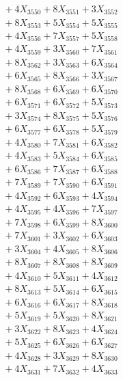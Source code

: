 \documentclass[a4paper,10pt]{article}
\begin{document}
{\begin{align}
&\;  + 4 X_{3550} + 8 X_{3551} + 3 X_{3552} \\[0.3ex]
&\;  + 8 X_{3553} + 5 X_{3554} + 5 X_{3555} \\[0.3ex]
&\;  + 4 X_{3556} + 7 X_{3557} + 5 X_{3558} \\[0.3ex]
&\;  + 4 X_{3559} + 3 X_{3560} + 7 X_{3561} \\[0.3ex]
&\;  + 8 X_{3562} + 3 X_{3563} + 6 X_{3564} \\[0.3ex]
&\;  + 6 X_{3565} + 8 X_{3566} + 3 X_{3567} \\[0.3ex]
&\;  + 8 X_{3568} + 6 X_{3569} + 6 X_{3570} \\[0.3ex]
&\;  + 6 X_{3571} + 6 X_{3572} + 5 X_{3573} \\[0.3ex]
&\;  + 3 X_{3574} + 8 X_{3575} + 5 X_{3576} \\[0.3ex]
&\;  + 6 X_{3577} + 6 X_{3578} + 5 X_{3579} \\[0.5ex]\allowbreak
&\;  + 4 X_{3580} + 7 X_{3581} + 6 X_{3582} \\[0.3ex]
&\;  + 4 X_{3583} + 5 X_{3584} + 6 X_{3585} \\[0.3ex]
&\;  + 6 X_{3586} + 7 X_{3587} + 6 X_{3588} \\[0.3ex]
&\;  + 7 X_{3589} + 7 X_{3590} + 6 X_{3591} \\[0.3ex]
&\;  + 4 X_{3592} + 6 X_{3593} + 4 X_{3594} \\[0.3ex]
&\;  + 4 X_{3595} + 4 X_{3596} + 7 X_{3597} \\[0.3ex]
&\;  + 7 X_{3598} + 6 X_{3599} + 8 X_{3600} \\[0.3ex]
&\;  + 7 X_{3601} + 3 X_{3602} + 6 X_{3603} \\[0.3ex]
&\;  + 3 X_{3604} + 4 X_{3605} + 8 X_{3606} \\[0.3ex]
&\;  + 8 X_{3607} + 8 X_{3608} + 8 X_{3609} \\[0.5ex]\allowbreak
&\;  + 4 X_{3610} + 5 X_{3611} + 4 X_{3612} \\[0.3ex]
&\;  + 8 X_{3613} + 5 X_{3614} + 6 X_{3615} \\[0.3ex]
&\;  + 6 X_{3616} + 6 X_{3617} + 8 X_{3618} \\[0.3ex]
&\;  + 5 X_{3619} + 5 X_{3620} + 8 X_{3621} \\[0.3ex]
&\;  + 3 X_{3622} + 8 X_{3623} + 4 X_{3624} \\[0.3ex]
&\;  + 5 X_{3625} + 6 X_{3626} + 6 X_{3627} \\[0.3ex]
&\;  + 4 X_{3628} + 3 X_{3629} + 8 X_{3630} \\[0.3ex]
&\;  + 4 X_{3631} + 7 X_{3632} + 4 X_{3633} \\[0.3ex]

\end{align}}
\end{document}
